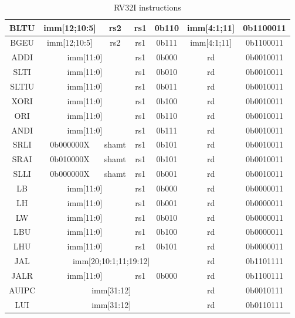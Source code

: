 \documentclass{scrreprt}
\begin{document}
\begin{table}[htb!]
\begin{tabular}{|c|c|c|c|c|c|c|}
             BLTU & imm[12;10:5] & rs2 & rs1 & 0b110 & imm[4:1;11] & 0b1100011\\ \hline 
             BGEU & imm[12;10:5] & rs2 & rs1 & 0b111 & imm[4:1;11] & 0b1100011\\ \hline
             ADDI & \multicolumn{2}{c|}{imm[11:0]} & rs1 & 0b000 & rd & 0b0010011\\ \hline 
             SLTI &  \multicolumn{2}{c|}{imm[11:0]} & rs1 & 0b010 & rd & 0b0010011\\ \hline 
             SLTIU & \multicolumn{2}{c|}{imm[11:0]} & rs1 & 0b011 & rd & 0b0010011\\ \hline 
             XORI &  \multicolumn{2}{c|}{imm[11:0]} & rs1 & 0b100 & rd & 0b0010011\\ \hline 
             ORI & \multicolumn{2}{c|}{imm[11:0]} & rs1 & 0b110 & rd & 0b0010011\\ \hline 
             ANDI &  \multicolumn{2}{c|}{imm[11:0]}& rs1 & 0b111 & rd & 0b0010011\\ \hline
             SRLI & 0b000000X & shamt & rs1 & 0b101 & rd & 0b0010011\\ \hline 
             SRAI & 0b010000X & shamt & rs1 & 0b101 & rd & 0b0010011 \\ \hline 
             SLLI & 0b000000X & shamt & rs1 & 0b001 & rd & 0b0010011\\ \hline
             LB & \multicolumn{2}{c|}{imm[11:0]} & rs1 & 0b000 & rd & 0b0000011\\ \hline 
             LH &  \multicolumn{2}{c|}{imm[11:0]} & rs1 & 0b001 & rd & 0b0000011\\ \hline 
             LW & \multicolumn{2}{c|}{imm[11:0]} & rs1 & 0b010 & rd & 0b0000011\\ \hline 
             LBU &  \multicolumn{2}{c|}{imm[11:0]} & rs1 & 0b100 & rd & 0b0000011\\ \hline 
             LHU & \multicolumn{2}{c|}{imm[11:0]} & rs1 & 0b101 & rd & 0b0000011\\ \hline
             JAL & \multicolumn{4}{c|}{imm[20;10:1;11;19:12]}& rd & 0b1101111\\ \hline
             JALR & \multicolumn{2}{c|}{imm[11:0]} & rs1 & 0b000 & rd & 0b1100111\\ \hline
             AUIPC & \multicolumn{4}{c|}{imm[31:12]}& rd & 0b0010111\\ \hline
             LUI & \multicolumn{4}{c|}{imm[31:12]} & rd & 0b0110111\\ \hline
        \end{tabular}
        \caption{RV32I instructions}
        \label{tab:table}
    \end{table}
    \newline
\hfill \break
\hfill \break
\hfill \break
\hfill \break
\hfill \break
\end{document}
